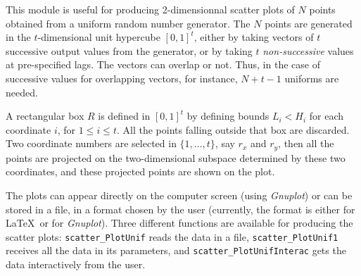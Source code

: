 

This module is useful for producing 2-dimensionnal scatter
plots of $N$ points obtained from a uniform random number generator.
The $N$ points are generated in the $t$-dimensional unit hypercube $[0,1]^t$,
either by taking vectors of $t$ successive output values from the generator,
or by taking $t$ {\em non-successive\/} values at pre-specified lags.
The vectors can overlap or not.
Thus, in the case of successive values for overlapping vectors,
for instance, $N+t-1$ uniforms are needed.

A rectangular box $R$ is defined in $[0,1]^t$ by defining bounds $L_i < H_i$
for each coordinate $i$, for $1\le i\le t$. 
All the points falling outside that box are discarded.
Two coordinate numbers are selected in $\{1,\dots,t\}$, say 
$r_x$ and $r_y$, then all the points are projected on the two-dimensional
subspace determined by these two coordinates, 
and these projected points are shown on the plot.

The plots can appear directly on the computer screen (using {\it Gnuplot})
or can be stored in a file, in a format chosen by the user
(currently, the format is either for \LaTeX\ or for  {\it Gnuplot}).
Three different functions are available for producing the scatter plots:
{\tt scatter\_PlotUnif} reads the data in a file,
{\tt scatter\_PlotUnif1} receives all the data in its parameters, and
{\tt scatter\_PlotUnifInterac} gets the data interactively from the user.


